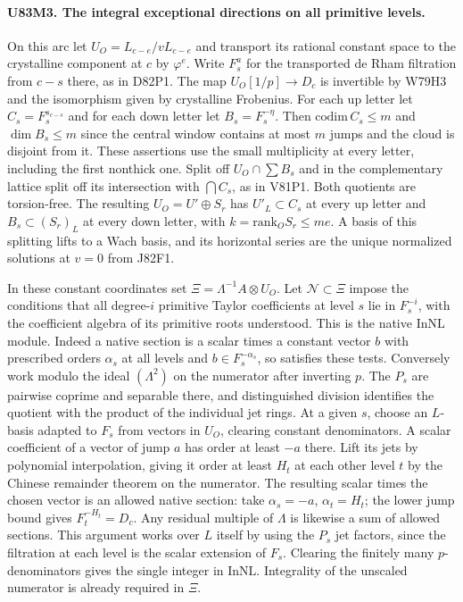 \paragraph{U83M3. The integral exceptional directions on all primitive levels.}
On this arc let $U_O=L_{c-e}/vL_{c-e}$ and transport its rational
constant space to the crystalline component at $c$ by $\varphi^e$.
Write $F_s^a$ for the transported de Rham filtration from $c-s$
there, as in D82P1. The map $U_O[1/p]\to D_c$ is invertible by
W79H3 and the isomorphism given by crystalline Frobenius. For each
up letter let $C_s=F_s^{s_{c-s}}$ and for each down letter let
$B_s=F_s^{-\eta}$. Then $\mathrm{codim}\,C_s\le m$ and
$\dim B_s\le m$ since the central window contains at most $m$
jumps and the cloud is disjoint from it. These assertions use the
small multiplicity at every letter, including the first nonthick one.
Split off $U_O\cap\sum B_s$ and in the complementary lattice split
off its intersection with $\bigcap C_s$, as in V81P1. Both quotients
are torsion-free. The resulting $U_O=U'\oplus S_r$ has
$U'_L\subset C_s$ at every up letter and $B_s\subset (S_r)_L$
at every down letter, with $k=\mathrm{rank}_O S_r\le me$.
A basis of this splitting lifts to a Wach basis, and its horizontal
series are the unique normalized solutions at $v=0$ from J82F1.

In these constant coordinates set $\Xi=\Lambda^{-1}A\otimes U_O$.
Let $\mathcal N\subset\Xi$ impose the conditions that all degree-$i$
primitive Taylor coefficients at level $s$ lie in $F_s^{-i}$,
with the coefficient algebra of its primitive roots understood.
This is the native $\mathrm{InNL}$ module. Indeed a native section
is a scalar times a constant vector $b$ with prescribed orders
$\alpha_s$ at all levels and $b\in F_s^{-\alpha_s}$, so satisfies
these tests. Conversely work modulo the ideal $(\Lambda^2)$
on the numerator after inverting $p$. The $P_s$ are pairwise
coprime and separable there, and distinguished division identifies
the quotient with the product of the individual jet rings.
At a given $s$, choose an $L$-basis adapted to $F_s$ from vectors
in $U_O$, clearing constant denominators. A scalar coefficient of
a vector of jump $a$ has order at least $-a$ there. Lift its jets
by polynomial interpolation, giving it order at least $H_t$ at
each other level $t$ by the Chinese remainder theorem on the
numerator. The resulting scalar times the chosen vector is an
allowed native section: take $\alpha_s=-a$, $\alpha_t=H_t$;
the lower jump bound gives $F_t^{-H_t}=D_c$. Any residual
multiple of $\Lambda$ is likewise a sum of allowed sections.
This argument works over $L$ itself by using the $P_s$ jet factors,
since the filtration at each level is the scalar extension of
$F_s$. Clearing the finitely many $p$-denominators gives the
single integer in $\mathrm{InNL}$. Integrality of the unscaled
numerator is already required in $\Xi$.

